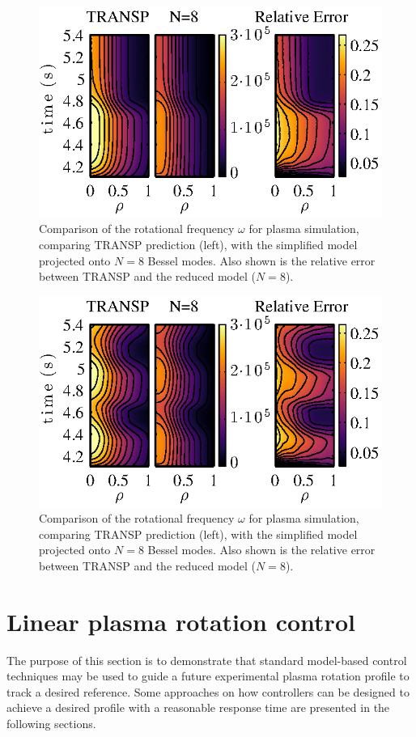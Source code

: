 \documentclass[12pt,lot, lof]{puthesis}
\begin{document}
\begin{figure} 
\centering
\includegraphics [width=0.8 \linewidth]{chap10/fig11} 
\caption{Comparison of the rotational frequency $\omega$ for plasma simulation, comparing TRANSP prediction (left), with the simplified model projected onto $N=8$ Bessel modes.  Also shown is the relative error between TRANSP and the reduced model ($N=8$).}
\label{Err2}
\end{figure}

\begin{figure} 
\centering
\includegraphics [width=0.8 \linewidth]{chap10/fig10} 
\caption{Comparison of the rotational frequency $\omega$ for plasma simulation, comparing TRANSP prediction (left), with the simplified model projected onto $N=8$ Bessel modes.  Also shown is the relative error between TRANSP and the reduced model ($N=8$).}
\label{Err1}
\end{figure}

\section{Linear plasma rotation control}
 \label{LRPC}
The purpose of this section is to demonstrate that standard model-based control techniques may be used to guide a future experimental plasma rotation profile to track a desired reference. Some approaches on how controllers can be designed to achieve a desired profile with a reasonable response time are presented in the following sections.
 
\end{document}
